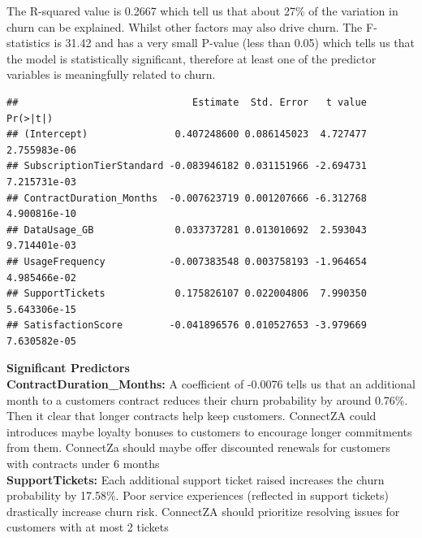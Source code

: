 \documentclass[
]{article}
\newenvironment{Shaded}{\begin{snugshade}}{\end{snugshade}}
\newcommand{\CommentTok}[1]{\textcolor[rgb]{0.56,0.35,0.01}{\textit{#1}}}
\newcommand{\DecValTok}[1]{\textcolor[rgb]{0.00,0.00,0.81}{#1}}
\newcommand{\FloatTok}[1]{\textcolor[rgb]{0.00,0.00,0.81}{#1}}
\newcommand{\FunctionTok}[1]{\textcolor[rgb]{0.13,0.29,0.53}{\textbf{#1}}}
\newcommand{\NormalTok}[1]{#1}
\newcommand{\SpecialCharTok}[1]{\textcolor[rgb]{0.81,0.36,0.00}{\textbf{#1}}}
\begin{document}
\hfill\break
The R-squared value is 0.2667 which tell us that about 27\% of the
variation in churn can be explained. Whilst other factors may also drive
churn. The F-statistics is 31.42 and has a very small P-value (less than
0.05) which tells us that the model is statistically significant,
therefore at least one of the predictor variables is meaningfully
related to churn.\\

\begin{Shaded}
\end{Shaded}

\begin{verbatim}
##                              Estimate  Std. Error   t value     Pr(>|t|)
## (Intercept)               0.407248600 0.086145023  4.727477 2.755983e-06
## SubscriptionTierStandard -0.083946182 0.031151966 -2.694731 7.215731e-03
## ContractDuration_Months  -0.007623719 0.001207666 -6.312768 4.900816e-10
## DataUsage_GB              0.033737281 0.013010692  2.593043 9.714401e-03
## UsageFrequency           -0.007383548 0.003758193 -1.964654 4.985466e-02
## SupportTickets            0.175826107 0.022004806  7.990350 5.643306e-15
## SatisfactionScore        -0.041896576 0.010527653 -3.979669 7.630582e-05
\end{verbatim}

\textbf{Significant Predictors}\\
\textbf{ContractDuration\_Months:} A coefficient of -0.0076 tells us
that an additional month to a customers contract reduces their churn
probability by around 0.76\%. Then it clear that longer contracts help
keep customers. ConnectZA could introduces maybe loyalty bonuses to
customers to encourage longer commitments from them. ConnectZa should
maybe offer discounted renewals for customers with contracts under 6
months\\
\textbf{SupportTickets:} Each additional support ticket raised increases
the churn probability by 17.58\%. Poor service experiences (reflected in
support tickets) drastically increase churn risk. ConnectZA should
prioritize resolving issues for customers with at most 2 tickets\\
\end{document}
